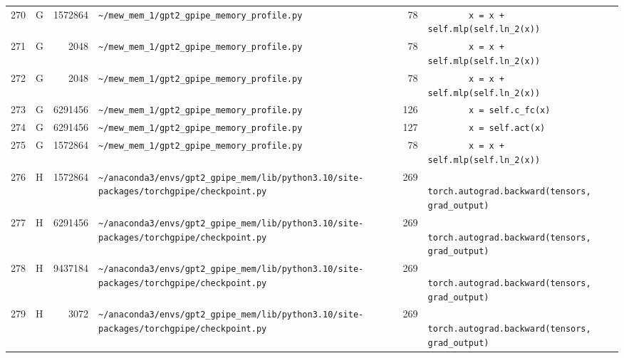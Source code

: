 \documentclass{article}
\begin{document}
\begin{longtable}{r l r p{6.5cm} r p{7.0cm}}
270 & G & 1572864 & \lstinline|~/mew_mem_1/gpt2_gpipe_memory_profile.py| & 78 & \lstinline|        x = x + self.mlp(self.ln_2(x))| \\
271 & G & 2048 & \lstinline|~/mew_mem_1/gpt2_gpipe_memory_profile.py| & 78 & \lstinline|        x = x + self.mlp(self.ln_2(x))| \\
272 & G & 2048 & \lstinline|~/mew_mem_1/gpt2_gpipe_memory_profile.py| & 78 & \lstinline|        x = x + self.mlp(self.ln_2(x))| \\
273 & G & 6291456 & \lstinline|~/mew_mem_1/gpt2_gpipe_memory_profile.py| & 126 & \lstinline|        x = self.c_fc(x)| \\
274 & G & 6291456 & \lstinline|~/mew_mem_1/gpt2_gpipe_memory_profile.py| & 127 & \lstinline|        x = self.act(x)| \\
275 & G & 1572864 & \lstinline|~/mew_mem_1/gpt2_gpipe_memory_profile.py| & 78 & \lstinline|        x = x + self.mlp(self.ln_2(x))| \\
276 & H & 1572864 & \lstinline|~/anaconda3/envs/gpt2_gpipe_mem/lib/python3.10/site-packages/torchgpipe/checkpoint.py| & 269 & \lstinline|            torch.autograd.backward(tensors, grad_output)| \\
277 & H & 6291456 & \lstinline|~/anaconda3/envs/gpt2_gpipe_mem/lib/python3.10/site-packages/torchgpipe/checkpoint.py| & 269 & \lstinline|            torch.autograd.backward(tensors, grad_output)| \\
278 & H & 9437184 & \lstinline|~/anaconda3/envs/gpt2_gpipe_mem/lib/python3.10/site-packages/torchgpipe/checkpoint.py| & 269 & \lstinline|            torch.autograd.backward(tensors, grad_output)| \\
279 & H & 3072 & \lstinline|~/anaconda3/envs/gpt2_gpipe_mem/lib/python3.10/site-packages/torchgpipe/checkpoint.py| & 269 & \lstinline|            torch.autograd.backward(tensors, grad_output)| \\
\end{longtable}
\end{document}

